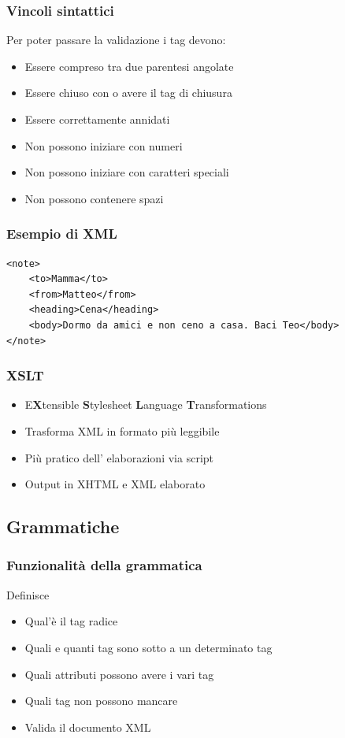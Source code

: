 \documentclass{beamer}
\begin{document}
\begin{frame}
    \frametitle{Vincoli sintattici}
    Per poter passare la validazione i tag devono:
    \begin{itemize}
    \item <2->Essere compreso tra due parentesi angolate 
    \item <3->Essere chiuso con \/ o avere il tag di chiusura
    \item <4->Essere correttamente annidati 
    \item <5->Non possono iniziare con numeri 
    \item <6->Non possono iniziare con caratteri speciali
    \item <7->Non possono contenere spazi 
    \end{itemize}
\end{frame}


\begin{frame}[fragile]
    \frametitle{Esempio di XML}
    \begin{verbatim}
<note>
    <to>Mamma</to> 
    <from>Matteo</from> 
    <heading>Cena</heading> 
    <body>Dormo da amici e non ceno a casa. Baci Teo</body> 
</note> 
    \end{verbatim}
\end{frame}

\begin{frame}
    \frametitle{XSLT}
    \begin{itemize}
    \item <1->E\textbf{X}tensible \textbf{S}tylesheet \textbf{L}anguage \textbf{T}ransformations
    \item <2-> Trasforma XML in formato più leggibile
    \item <3-> Più pratico dell' elaborazioni via script
    \item <4-> Output in XHTML e XML elaborato
    \end{itemize}
\end{frame}

\subsection{Grammatiche}
\begin{frame}
    \frametitle{Funzionalità della grammatica}
    Definisce
    \begin{itemize}
        \item<2-> Qual'è il tag radice
        \item<3-> Quali e quanti tag sono sotto a un determinato tag
        \item<4-> Quali attributi possono avere i vari tag
        \item<5-> Quali tag non possono mancare 
        \item<6-> Valida il documento XML
    \end{itemize}
\end{frame}
\end{document}
